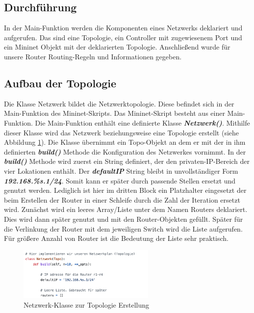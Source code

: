 \documentclass[fontsize=12pt,paper=a4,open=any,parskip=half,
  twoside=false,toc=listof,toc=bibliography,fleqn,leqno,
  captions=nooneline,captions=tableabove,british]{scrbook}
\begin{document}
\subsection{Durchführung}
In der Main-Funktion werden die Komponenten eines Netzwerks deklariert und aufgerufen. Das sind eine Topologie, ein Controller mit zugewiesenem Port und ein Mininet Objekt mit der deklarierten Topologie. Anschließend wurde für unsere Router Routing-Regeln und Informationen gegeben.

\subsection{Aufbau der Topologie}
Die Klasse Netzwerk bildet die Netzwerktopologie. Diese befindet sich in der Main-Funktion des Mininet-Skripts. Das Mininet-Skript besteht aus einer Main-Funktion. Die Main-Funktion enthält eine definierte Klasse \textit{\textbf{Netzwerk()}}. Mithilfe dieser Klasse wird das Netzwerk beziehungsweise eine Topologie erstellt (siehe Abbildung \ref{mininet1}). Die Klasse übernimmt ein Topo-Objekt an dem er mit der in ihm definierten \textit{\textbf{build()}} Methode die Konfiguration des Netzwerkes vornimmt. In der \textit{\textbf{build()}} Methode wird zuerst ein String definiert, der den privaten-IP-Bereich der vier Lokationen enthält. Der \textit{\textbf{defaultIP}} String bleibt in unvollständiger Form \textit{\textbf{192.168.\%s.1/24}}. Somit kann er später durch passende Stellen ersetzt und genutzt werden. Lediglich ist hier im dritten Block ein Platzhalter eingesetzt der beim Erstellen der Router in einer Schleife durch die Zahl der Iteration ersetzt wird. Zunächst wird ein leeres Array/Liste unter dem Namen Routers deklariert. Dies wird dann später genutzt und mit den Router-Objekten gefüllt. Später für die Verlinkung der Router mit dem jeweiligen Switch wird die Liste aufgerufen. Für größere Anzahl von Router ist die Bedeutung der Liste sehr praktisch.

\begin{figure}[H]
 \centering
 \includegraphics[width=0.6\textwidth]{Bilder/mininet1}
 \captionsetup{justification=centering,margin=1cm}
 \caption{Netzwerk-Klasse zur Topologie Erstellung}
 \label{mininet1}
\end{figure}
\end{document}
